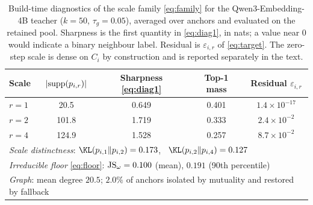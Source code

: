 \begin{table}[t]
\centering
\caption{Build-time diagnostics of the scale family \eqref{eq:family} for the
Qwen3-Embedding-4B teacher ($k=50$, $\tau_g=0.05$), averaged over anchors and evaluated on
the retained pool. Sharpness is the first quantity in \eqref{eq:diag1}, in nats; a value near $0$ would indicate
a binary neighbour label. Residual is $\varepsilon_{i,r}$ of \eqref{eq:target}. The
zero-step scale is dense on $C_i$ by construction and is reported separately in the text.}
\label{tab:diag}
\small
\begin{tabular}{lcccc}
\toprule
Scale & $|\mathrm{supp}(p_{i,r})|$ & Sharpness \eqref{eq:diag1} & Top-1 mass & Residual $\varepsilon_{i,r}$ \\
\midrule
$r=1$ & \phantom{0}20.5 & 0.649 & 0.401 & $1.4\times10^{-17}$ \\
$r=2$ & 101.8 & 1.719 & 0.333 & $2.4\times10^{-2}$ \\
$r=4$ & 124.9 & 1.528 & 0.257 & $8.7\times10^{-2}$ \\
\midrule
\multicolumn{5}{l}{\emph{Scale distinctness}: $\KL(p_{i,1}\Vert p_{i,2})=0.173$, \ $\KL(p_{i,2}\Vert p_{i,4})=0.127$} \\
\multicolumn{5}{l}{\emph{Irreducible floor} \eqref{eq:floor}: $\mathrm{JS}_\omega = 0.100$ (mean), $0.191$ (90th percentile)} \\
\multicolumn{5}{l}{\emph{Graph}: mean degree $20.5$; $2.0\%$ of anchors isolated by mutuality and restored by fallback} \\
\bottomrule
\end{tabular}
\end{table}
